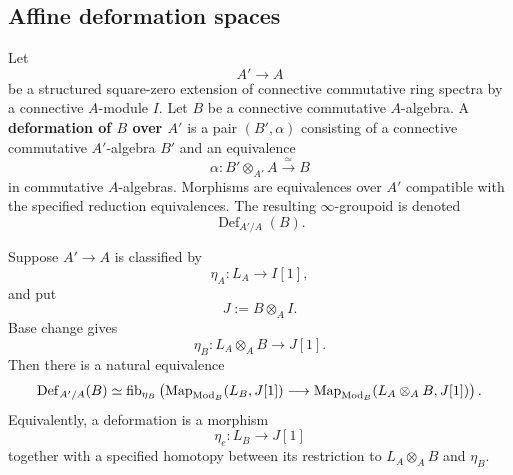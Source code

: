 \subsection{Affine deformation spaces}

\begin{definition}
\label{def:affine-deformation-square-zero}
Let
\[
    A'\longrightarrow A
\]
be a structured square-zero extension of connective commutative ring spectra
by a connective \(A\)-module \(I\). Let \(B\) be a connective commutative
\(A\)-algebra. A \textbf{deformation of \(B\) over \(A'\)} is a pair
\((B',\alpha)\) consisting of a connective commutative \(A'\)-algebra \(B'\)
and an equivalence
\[
    \alpha:B'\otimes_{A'}A\xrightarrow{\simeq}B
\]
in commutative \(A\)-algebras. Morphisms are equivalences over \(A'\)
compatible with the specified reduction equivalences. The resulting
\(\infty\)-groupoid is denoted
\[
    \operatorname{Def}_{A'/A}(B).
\]
\end{definition}

\begin{theorem}
\label{thm:affine-deformation-homotopy-fibre}
Suppose \(A'\to A\) is classified by
\[
    \eta_A:L_A\longrightarrow I[1],
\]
and put
\[
    J:=B\otimes_AI.
\]
Base change gives
\[
    \eta_B:
    L_A\otimes_AB
    \longrightarrow
    J[1].
\]
Then there is a natural equivalence
\[
\operatorname{Def}_{A'/A}(B)
\simeq
\operatorname{fib}_{\eta_B}
\left(
    \operatorname{Map}_{\operatorname{Mod}_B}(L_B,J[1])
    \longrightarrow
    \operatorname{Map}_{\operatorname{Mod}_B}(L_A\otimes_AB,J[1])
\right).
\]
Equivalently, a deformation is a morphism
\[
    \eta_e:L_B\longrightarrow J[1]
\]
together with a specified homotopy between its restriction to
\(L_A\otimes_AB\) and \(\eta_B\).
\end{theorem}

